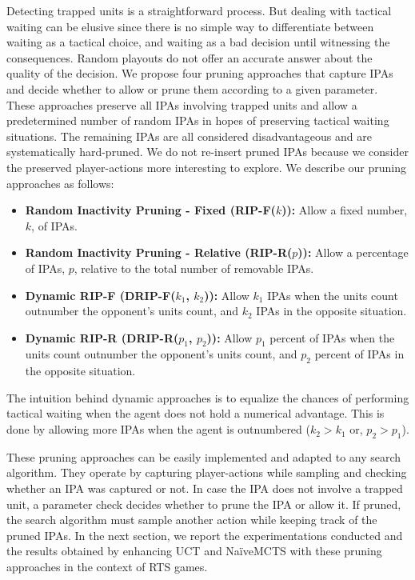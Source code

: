 \documentclass[conference]{IEEEtran}
\begin{document}
Detecting trapped units is a straightforward process. But dealing with tactical waiting can be elusive since there is no simple way to differentiate between waiting as a tactical choice, and waiting as a bad decision until witnessing the consequences. Random playouts do not offer an accurate answer about the quality of the decision. We propose four pruning approaches that capture IPAs and decide whether to allow or prune them according to a given parameter. These approaches preserve all IPAs involving trapped units and allow a predetermined number of random IPAs in hopes of preserving tactical waiting situations. The remaining IPAs are all considered disadvantageous and are systematically hard-pruned. We do not re-insert pruned IPAs because we consider the preserved player-actions more interesting to explore. We describe our pruning approaches as follows:

\begin{itemize}
\item \textbf{Random Inactivity Pruning - Fixed (RIP-F($k$)):} Allow a fixed number, $k$, of IPAs.
\item \textbf{Random Inactivity Pruning - Relative (RIP-R($p$)):} Allow a percentage of IPAs, $p$, relative to the total number of removable IPAs.
\item \textbf{Dynamic RIP-F (DRIP-F($k_1$, $k_2$)):} Allow $k_1$ IPAs when the units count outnumber the opponent's units count, and $k_2$ IPAs in the opposite situation.
\item \textbf{Dynamic RIP-R (DRIP-R($p_1$, $p_2$)):} Allow $p_1$ percent of IPAs when the units count outnumber the opponent's units count, and $p_2$ percent of IPAs in the opposite situation.
\end{itemize}

The intuition behind dynamic approaches is to equalize the chances of performing tactical waiting when the agent does not hold a numerical advantage. This is done by allowing more IPAs when the agent is outnumbered ($k_2 > k_1$ or, $p_2 > p_1$).

These pruning approaches can be easily implemented and adapted to any search algorithm. They operate by capturing player-actions while sampling and checking whether an IPA was captured or not. In case the IPA does not involve a trapped unit, a parameter check decides whether to prune the IPA or allow it. If pruned, the search algorithm must sample another action while keeping track of the pruned IPAs. In the next section, we report the experimentations conducted and the results obtained by enhancing UCT and NaïveMCTS with these pruning approaches in the context of RTS games.
\end{document}
